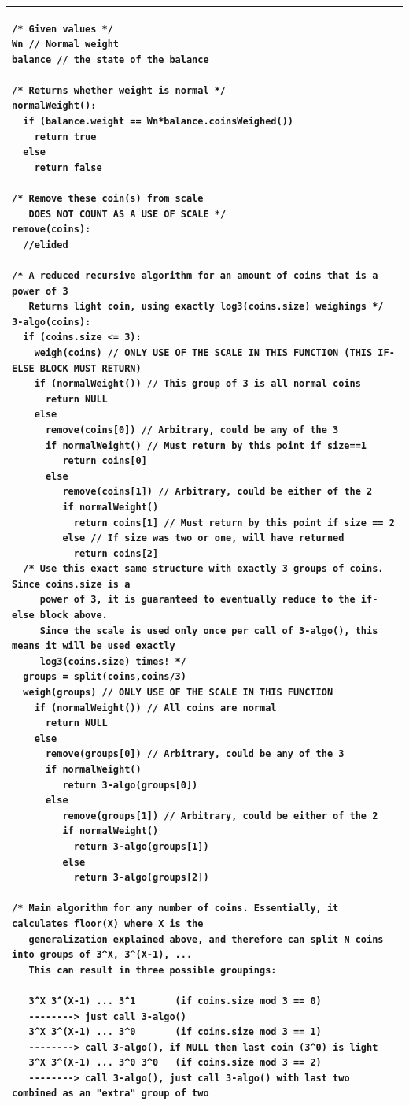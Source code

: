 \documentclass[10pt]{article}
\makeatletter
\newcommand{\verbatimfont}[1]{\renewcommand{\verbatim@font}{\ttfamily#1}}
\newenvironment{answer}
    {\begin{center}
    \begin{tabular}{|p{1\textwidth}|}
    \hline
    }
    { 
    \\\hline
    \end{tabular} 
    \end{center}
    }
\makeatother
\begin{document}
\begin{answer}
\verbatimfont{\scriptsize}%
\begin{verbatim}
/* Given values */
Wn // Normal weight
balance // the state of the balance

/* Returns whether weight is normal */
normalWeight():
  if (balance.weight == Wn*balance.coinsWeighed())
    return true
  else
    return false

/* Remove these coin(s) from scale 
   DOES NOT COUNT AS A USE OF SCALE */
remove(coins):
  //elided

/* A reduced recursive algorithm for an amount of coins that is a power of 3 
   Returns light coin, using exactly log3(coins.size) weighings */
3-algo(coins):     
  if (coins.size <= 3):
    weigh(coins) // ONLY USE OF THE SCALE IN THIS FUNCTION (THIS IF-ELSE BLOCK MUST RETURN)
    if (normalWeight()) // This group of 3 is all normal coins
      return NULL
    else 
      remove(coins[0]) // Arbitrary, could be any of the 3
      if normalWeight() // Must return by this point if size==1
         return coins[0]
      else
         remove(coins[1]) // Arbitrary, could be either of the 2
         if normalWeight()
           return coins[1] // Must return by this point if size == 2
         else // If size was two or one, will have returned 
           return coins[2]
  /* Use this exact same structure with exactly 3 groups of coins. Since coins.size is a 
     power of 3, it is guaranteed to eventually reduce to the if-else block above.
     Since the scale is used only once per call of 3-algo(), this means it will be used exactly 
     log3(coins.size) times! */
  groups = split(coins,coins/3)
  weigh(groups) // ONLY USE OF THE SCALE IN THIS FUNCTION
    if (normalWeight()) // All coins are normal 
      return NULL
    else 
      remove(groups[0]) // Arbitrary, could be any of the 3
      if normalWeight()
         return 3-algo(groups[0])
      else
         remove(groups[1]) // Arbitrary, could be either of the 2
         if normalWeight()
           return 3-algo(groups[1])
         else
           return 3-algo(groups[2])

/* Main algorithm for any number of coins. Essentially, it calculates floor(X) where X is the 
   generalization explained above, and therefore can split N coins into groups of 3^X, 3^(X-1), ...
   This can result in three possible groupings:

   3^X 3^(X-1) ... 3^1       (if coins.size mod 3 == 0) 
   --------> just call 3-algo()
   3^X 3^(X-1) ... 3^0       (if coins.size mod 3 == 1) 
   --------> call 3-algo(), if NULL then last coin (3^0) is light
   3^X 3^(X-1) ... 3^0 3^0   (if coins.size mod 3 == 2) 
   --------> call 3-algo(), just call 3-algo() with last two combined as an "extra" group of two


\end{verbatim}
\end{answer}
\end{document}
